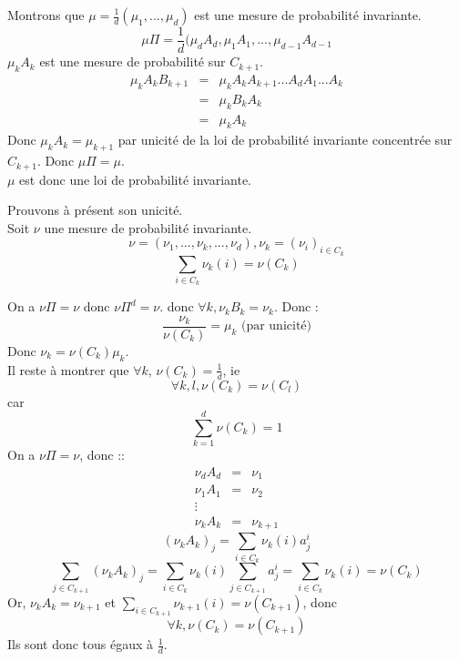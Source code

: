 \begin{dem}
Montrons que $\mu=\frac{1}{d}(\mu_1,...,\mu_d)$ est une mesure de probabilité invariante.
	\[\mu \Pi = \frac{1}{d} (\mu_dA_d , \mu_1A_1, ... , \mu_{d-1}A_{d-1}\]
$\mu_k A_k$ est une mesure de probabilité sur $C_{k+1}$. 
\begin{eqnarray*}
\mu_kA_kB_{k+1}&=&\mu_kA_kA_{k+1}...A_dA_1...A_k \\
		&=& \mu_k B_k A_k\\
		&=& \mu_k A_k
\end{eqnarray*}
Donc $\mu_k A_k=\mu_{k+1}$ par unicité de la loi de probabilité invariante concentrée sur $C_{k+1}$. Donc $\mu\Pi=\mu$.\\
$\mu$ est donc une loi de probabilité invariante.

\bigskip
Prouvons à présent son unicité.\\
Soit $\nu$ une mesure de probabilité invariante.
	\[\nu=(\nu_1,...,\nu_k,...,\nu_d), \nu_k=(\nu_i)_{i\in C_k}\]
	\[\sum_{i\in C_k} \nu_k(i) = \nu(C_k)\]

On a $\nu\Pi=\nu$ donc $\nu\Pi^d=\nu$. donc $\forall k, \nu_kB_k=\nu_k$. Donc :
	\[\frac{\nu_k}{\nu(C_k)} = \mu_k \text{ (par unicité)}\]
Donc $\nu_k=\nu(C_k)\mu_k$.\\

\bigskip
Il reste à montrer que $\forall k$, $\nu(C_k)=\frac{1}{d}$, ie 
	\[\forall k,l, \nu(C_k)=\nu(C_l)\]
car
	\[\sum_{k=1}^d \nu(C_k)=1\]
On a $\nu\Pi=\nu$, donc ::
	\begin{eqnarray*}
		\nu_dA_d&=&\nu_1 \\
		\nu_1A_1&=&\nu_2 \\
		\vdots \\
		\nu_kA_k &=& \nu_{k+1}
	\end{eqnarray*}
\[(\nu_kA_k)_j=\sum_{i\in C_k} \nu_k(i) a_j^i\]
\[\sum_{j\in C_{k+1}} (\nu_k A_k)_j = \sum_{i\in C_k} \nu_k(i) \sum_{j\in C_{k+1}} a^i_j = \sum_{i\in C_k} \nu_k(i) = \nu(C_k)\]
Or, $\nu_kA_k=\nu_{k+1}$ et $\sum_{i\in C_{k+1}} \nu_{k+1}(i)=\nu(C_{k+1})$, donc 
	\[\forall k, \nu(C_k)=\nu(C_{k+1})\]
Ils sont donc tous égaux à $\frac{1}{d}$.
\end{dem}

